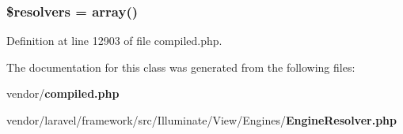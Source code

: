 \subsubsection[{\$resolvers}]{\setlength{\rightskip}{0pt plus 5cm}\$resolvers = array()\hspace{0.3cm}{\ttfamily [protected]}}\label{class_illuminate_1_1_view_1_1_engines_1_1_engine_resolver_a73c2a0bd3d10f0b75dcb585d82dfc1b8}


Definition at line 12903 of file compiled.\+php.



The documentation for this class was generated from the following files\+:\begin{DoxyCompactItemize}
\item 
vendor/{\bf compiled.\+php}\item 
vendor/laravel/framework/src/\+Illuminate/\+View/\+Engines/{\bf Engine\+Resolver.\+php}\end{DoxyCompactItemize}
